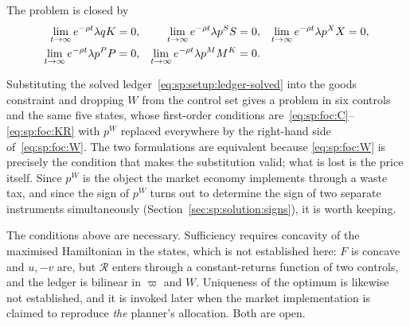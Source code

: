  The problem is closed by
\begin{align}
\lim_{t\to\infty}e^{-\rho t}\lambda q K &= 0,
&
\lim_{t\to\infty}e^{-\rho t}\lambda p^S S &= 0,
&
\lim_{t\to\infty}e^{-\rho t}\lambda p^X X &= 0,
\notag\\
\lim_{t\to\infty}e^{-\rho t}\lambda p^P P &= 0,
&
\lim_{t\to\infty}e^{-\rho t}\lambda p^M M^K &= 0 .
&&
\label{eq:sp:problem:tvc}
\end{align}

\begin{remark}\label{rem:sp:reduced}
Substituting the solved ledger~\eqref{eq:sp:setup:ledger-solved} into the goods constraint and
dropping $W$ from the control set gives a problem in six controls and the same five states, whose
first-order conditions are~\eqref{eq:sp:foc:C}--\eqref{eq:sp:foc:KR} with $p^W$ replaced everywhere
by the right-hand side of~\eqref{eq:sp:foc:W}. The two formulations are equivalent because
\eqref{eq:sp:foc:W} is precisely the condition that makes the substitution valid; what is lost is
the price itself. Since $p^W$ is the object the market economy implements through a waste tax, and
since the sign of $p^W$ turns out to determine the sign of two separate instruments simultaneously
(Section~\ref{sec:sp:solution:signs}), it is worth keeping.
\end{remark}

\begin{remark}\label{rem:sp:soc}
The conditions above are necessary. Sufficiency requires concavity of the maximised Hamiltonian in
the states, which is not established here: $F$ is concave and $u,-v$ are, but $\mathcal R$ enters
through a constant-returns function of two controls, and the ledger is bilinear in $\varpi$ and $W$.
Uniqueness of the optimum is likewise not established, and it is invoked later when the market
implementation is claimed to reproduce \emph{the} planner's allocation. Both are open.
\end{remark}
